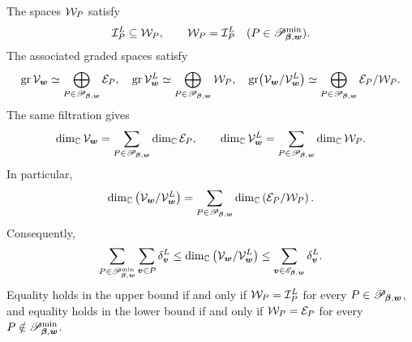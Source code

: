 \begin{theorem}
	\label{thm:formal-solution-codimension-bounds}
	The spaces \(\mathcal W_P\) satisfy
	\begin{equation}
		\mathcal I_P^{L}
		\subseteq
		\mathcal W_P,
		\qquad
		\mathcal W_P=\mathcal I_P^{L}
		\quad
		(P\in\mathscr P_{\boldsymbol{\beta},\boldsymbol{w}}^{\min}).
		\label{eq:formal-filtration-local-spaces}
	\end{equation}
	The associated graded spaces satisfy
	\begin{equation}
		\operatorname{gr}\mathcal V_{\boldsymbol{w}}\simeq\bigoplus_{P\in\mathscr P_{\boldsymbol{\beta},\boldsymbol{w}}}\mathcal E_P, \quad \operatorname{gr}\mathcal V_{\boldsymbol{w}}^{L}\simeq\bigoplus_{P\in\mathscr P_{\boldsymbol{\beta},\boldsymbol{w}}}\mathcal W_P, \quad \operatorname{gr}\bigl(\mathcal V_{\boldsymbol{w}}/\mathcal V_{\boldsymbol{w}}^{L}\bigr)\simeq\bigoplus_{P\in\mathscr P_{\boldsymbol{\beta},\boldsymbol{w}}}\mathcal E_P/\mathcal W_P.
		\label{eq:formal-filtration-graded}
	\end{equation}
	The same filtration gives
	\begin{equation}
		\dim_{\mathbb C}\mathcal V_{\boldsymbol{w}}=\sum_{P\in\mathscr P_{\boldsymbol{\beta},\boldsymbol{w}}}\dim_{\mathbb C}\mathcal E_P, \qquad \dim_{\mathbb C}\mathcal V_{\boldsymbol{w}}^{L}=\sum_{P\in\mathscr P_{\boldsymbol{\beta},\boldsymbol{w}}}\dim_{\mathbb C}\mathcal W_P.
		\label{eq:formal-filtration-dimensions}
	\end{equation}
	In particular,
	\begin{equation}
		\dim_{\mathbb C}
		\left(
		\mathcal V_{\boldsymbol{w}}/\mathcal V_{\boldsymbol{w}}^{L}
		\right)
		=
		\sum_{P\in\mathscr P_{\boldsymbol{\beta},\boldsymbol{w}}}
		\dim_{\mathbb C}
		\left(
		\mathcal E_P/\mathcal W_P
		\right).
		\label{eq:formal-filtration-exact-codimension}
	\end{equation}
	Consequently,
	\begin{equation}
		\sum_{P\in\mathscr P_{\boldsymbol{\beta},\boldsymbol{w}}^{\min}}
		\sum_{\boldsymbol{v}\in P}\delta_{\boldsymbol{v}}^{L}
		\leq
		\dim_{\mathbb C}
		\left(
		\mathcal V_{\boldsymbol{w}}/\mathcal V_{\boldsymbol{w}}^{L}
		\right)
		\leq
		\sum_{\boldsymbol{v}\in\mathscr E_{\boldsymbol{\beta},\boldsymbol{w}}}
		\delta_{\boldsymbol{v}}^{L}.
		\label{eq:formal-solution-codimension-bounds}
	\end{equation}
	Equality holds in the upper bound if and only if \(\mathcal W_P=\mathcal I_P^{L}\) for every \(P\in\mathscr P_{\boldsymbol{\beta},\boldsymbol{w}}\), and equality holds in the lower bound if and only if \(\mathcal W_P=\mathcal E_P\) for every \(P\notin\mathscr P_{\boldsymbol{\beta},\boldsymbol{w}}^{\min}\).
\end{theorem}

